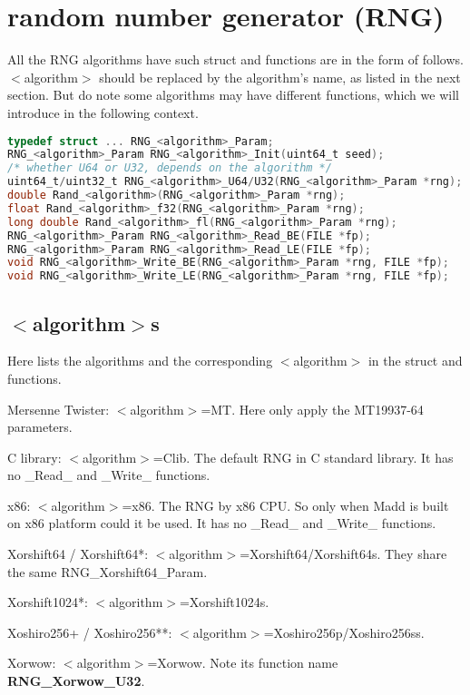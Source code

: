 \chapter{random number generator (RNG)}

All the RNG algorithms have such struct and functions are in the form of follows. $<$algorithm$>$ should be replaced by the algorithm's name, as listed in the next section. But do note some algorithms may have different functions, which we will introduce in the following context.
\begin{lstlisting}[language=C, title={Definition \& functions of RNG.},]
typedef struct ... RNG_<algorithm>_Param;
RNG_<algorithm>_Param RNG_<algorithm>_Init(uint64_t seed);
/* whether U64 or U32, depends on the algorithm */
uint64_t/uint32_t RNG_<algorithm>_U64/U32(RNG_<algorithm>_Param *rng);
double Rand_<algorithm>(RNG_<algorithm>_Param *rng);
float Rand_<algorithm>_f32(RNG_<algorithm>_Param *rng);
long double Rand_<algorithm>_fl(RNG_<algorithm>_Param *rng);
RNG_<algorithm>_Param RNG_<algorithm>_Read_BE(FILE *fp);
RNG_<algorithm>_Param RNG_<algorithm>_Read_LE(FILE *fp);
void RNG_<algorithm>_Write_BE(RNG_<algorithm>_Param *rng, FILE *fp);
void RNG_<algorithm>_Write_LE(RNG_<algorithm>_Param *rng, FILE *fp);
\end{lstlisting} 

\section{$<$algorithm$>$s}

Here lists the algorithms and the corresponding $<$algorithm$>$ in the struct and functions.

Mersenne Twister: $<$algorithm$>$=MT. Here only apply the MT19937-64 parameters. 

C library: $<$algorithm$>$=Clib. The default RNG in C standard library. It has no \_Read\_ and \_Write\_ functions.

x86: $<$algorithm$>$=x86. The RNG by x86 CPU. So only when Madd is built on x86 platform could it be used. It has no \_Read\_ and \_Write\_ functions.

Xorshift64 / Xorshift64*: $<$algorithm$>$=Xorshift64/Xorshift64s. They share the same RNG\_Xorshift64\_Param.

Xorshift1024*: $<$algorithm$>$=Xorshift1024s.

Xoshiro256+ / Xoshiro256**: $<$algorithm$>$=Xoshiro256p/Xoshiro256ss.

Xorwow: $<$algorithm$>$=Xorwow. Note its function name \textbf{RNG\_Xorwow\_U32}.

